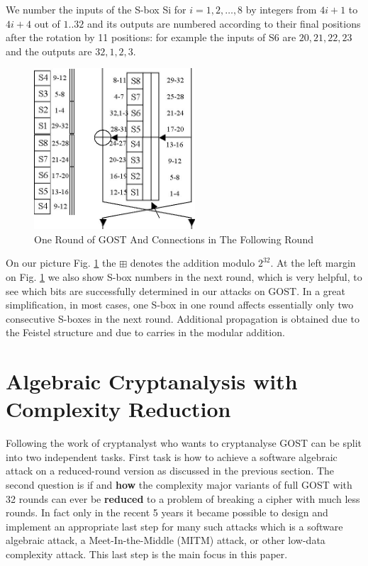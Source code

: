 We number the inputs of the S-box Si for $i=1,2,\ldots,8$ by integers from $4i+1$ to $4i+4$ out of $1..32$ and its outputs are numbered according to their final positions after the rotation by 11 positions: for example the inputs of S6 are $20,21,22,23$ and the outputs are $32,1,2,3$.


\begin{figure}[h]
	\centering
	\includegraphics[width=60mm]{./pics/gostfeist2.jpg}

	\caption{One Round of GOST And Connections in The Following Round}
	\label{GostRoundAndConnections}
\end{figure}



On our picture %
Fig. \ref{GostRoundAndConnections}
the $\boxplus$ denotes the addition modulo $2^{32}$.
At the left margin
on Fig. \ref{GostRoundAndConnections}
we also show S-box numbers
in the next round,
which is very helpful,
to see which bits are successfully determined
in our attacks on GOST.
In a great simplification,
in most cases,
one S-box in one round affects essentially
only two consecutive S-boxes in the next round.
Additional propagation is obtained due to the Feistel structure
and due to carries in the modular addition.

\section{Algebraic Cryptanalysis with Complexity Reduction}

Following \cite{gostreport,gostac}
the work of cryptanalyst
who wants to cryptanalyse GOST
can be split into two independent tasks.
First task is how to achieve a software algebraic attack
on a reduced-round version
as discussed in the previous section.
The second question is if and {\bf how}
the complexity major variants of full GOST with 32 rounds
can ever be {\bf reduced}
to a problem of breaking a cipher with much less rounds.
In fact only in the recent 5 years
it became possible to design and implement
an appropriate last step
for many such attacks
which is a software algebraic attack,
a Meet-In-the-Middle (MITM) attack, or other low-data complexity attack.
This last step is the main focus in this paper.


